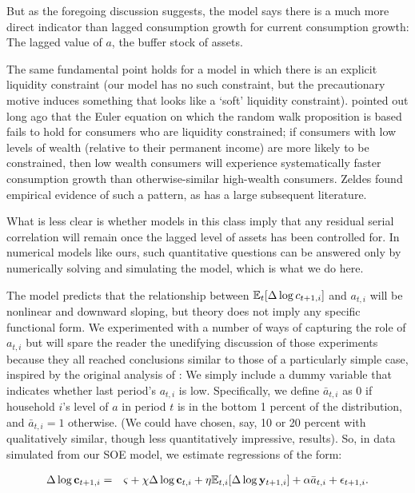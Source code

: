 \documentclass[titlepage]{./econtex}
\begin{document}
But as the foregoing discussion suggests, the model says there is a much more direct indicator than lagged consumption growth for current consumption growth:  The lagged value of $a$, the buffer stock of assets.

The same fundamental point holds for a model in which there is an explicit liquidity constraint (our model has no such constraint, but the precautionary motive induces something that looks like a `soft' liquidity constraint).  \cite{zeldes:jpe} pointed out long ago that the Euler equation on which the random walk proposition is based fails to hold for consumers who are liquidity constrained; if consumers with low levels of wealth (relative to their permanent income) are more likely to be constrained, then low wealth consumers will experience systematically faster consumption growth than otherwise-similar high-wealth consumers.  Zeldes found empirical evidence of such a pattern, as has a large subsequent literature.

What is less clear is whether models in this class imply that any residual serial correlation will remain once the lagged level of assets has been controlled for.  In numerical models like ours, such quantitative questions can be answered only by numerically solving and simulating the model, which is what we do here.

The model predicts that the relationship between $\operatorname{\mathbb{E}}_{t}[\Delta \log c_{t+1,i}]$ and $a_{t,i}$ will be nonlinear and downward sloping, but theory does not imply any specific functional form.  We experimented with a number of ways of capturing the role of $a_{t,i}$ but will spare the reader the unedifying discussion of those experiments because they all reached conclusions similar to those of a particularly simple case, inspired by the original analysis of \cite{zeldes:jpe}: We simply include a dummy variable that indicates whether last period's $a_{t,i}$ is low.  Specifically, we define $\bar{a}_{t,i}$ as 0 if household $i$'s level of ${a}$ in period $t$ is in the bottom 1 percent of the distribution, and $\bar{a}_{t,i}=1$ otherwise.  (We could have chosen, say, 10 or 20 percent with qualitatively similar, though less quantitatively impressive, results). So, in data simulated from our SOE model, we estimate regressions of the form: 

 \begin{eqnarray*}
\Delta \log       \mathbf{c} _{t+1,i}  &=&  \varsigma + \chi \Delta \log      \mathbf{c} _{t,i} + \eta     {\operatorname{\mathbb{E}}}_{t,i}[\Delta \log       \mathbf{y} _{t+1,i}]+ {\alpha} \bar{a}_{t,i}+\epsilon_{t+1,i}.
\end{eqnarray*}
\end{document}
